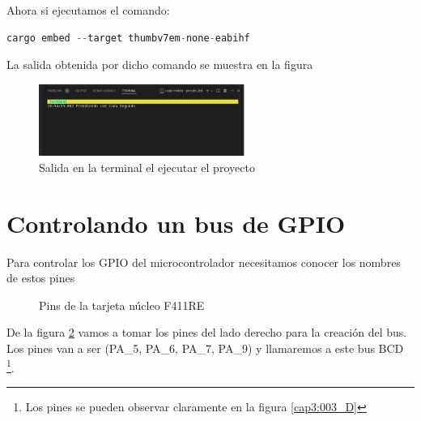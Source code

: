 Ahora si ejecutamos el comando:

\begin{lstlisting}[language=c]
cargo embed --target thumbv7em-none-eabihf	
\end{lstlisting}

La salida obtenida por dicho comando se muestra en la figura 

\begin{figure}[htb]
	\centering
	\includegraphics[width=0.6\textwidth]{capitulo3/salida_prender_led.png}
	\caption{Salida en la terminal el ejecutar el proyecto}
	\label{cap3:002}
\end{figure} 


\section{Controlando un bus de GPIO}

Para controlar los GPIO del microcontrolador necesitamos conocer los nombres de estos pines


\begin{figure}[htb]
	\centering
	\caption{Pins de la tarjeta núcleo F411RE}
	\label{cap3:003}
\end{figure}

De la figura \ref{cap3:003} vamos a tomar los pines del lado derecho para la creación del bus. Los pines van a ser (PA\_5, PA\_6, PA\_7, PA\_9) y llamaremos a este bus BCD \footnote[1]{Los pines se pueden observar claramente en la figura \ref{cap3:003_D}}.

